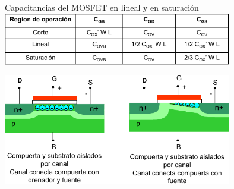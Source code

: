 \documentclass[t,aspectratio=169]{beamer}
\begin{document}
\begin{frame}{Capacitancias del MOSFET en lineal y en saturación}
\centering
\includegraphics[width=10cm]{./figuras/captable.pdf}

\vspace{3mm}
\includegraphics[width=10cm]{./figuras/MOScap2.pdf}
\end{frame}
\end{document}
